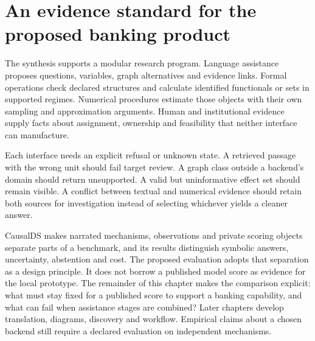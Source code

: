 \section{An evidence standard for the proposed banking product}

The synthesis supports a modular research program. Language assistance proposes
questions, variables, graph alternatives and evidence links. Formal operations
check declared structures and calculate identified functionals or sets in
supported regimes. Numerical procedures estimate those objects with their own
sampling and approximation arguments. Human and institutional evidence supply
facts about assignment, ownership and feasibility that neither interface can
manufacture.

Each interface needs an explicit refusal or unknown state. A retrieved passage
with the wrong unit should fail target review. A graph class outside a backend's
domain should return unsupported. A valid but uninformative effect set should
remain visible. A conflict between textual and numerical evidence should retain
both sources for investigation instead of selecting whichever yields a cleaner
answer.

CausalDS makes narrated mechanisms, observations and private scoring objects
separate parts of a benchmark, and its results distinguish symbolic answers,
uncertainty, abstention and cost. \citep{v12_la_2607_08093} The proposed evaluation
adopts that separation as a design principle. It does not borrow a published
model score as evidence for the local prototype. The remainder of this chapter
makes the comparison explicit: what must stay fixed for a published score to
support a banking capability, and what can fail when assistance stages are
combined? Later chapters develop translation, diagrams, discovery and workflow.
Empirical claims about a chosen backend still require a declared evaluation
on independent mechanisms.
